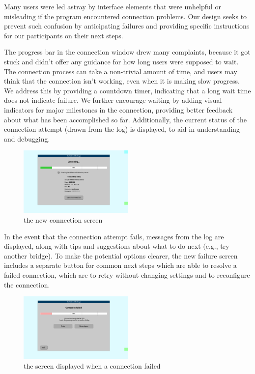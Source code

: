 \documentclass{template}
\begin{document}

Many users were led astray by interface elements that were unhelpful or
misleading if the program encountered connection problems. Our design seeks to
prevent such confusion by anticipating failures and providing specific instructions
for our participants on their next steps.

The progress bar in the connection window drew many complaints, because it got
stuck and didn't offer any guidance for how long users were supposed to wait. 
The connection process can take a non-trivial amount of time, and users may
think that the connection isn't working, even when it is making slow progress. We
address this by providing a countdown timer, indicating that a long wait time does
not indicate failure. We further encourage waiting by adding visual indicators
for major milestones in the connection, providing better feedback about what has
been accomplished so far. Additionally, the current status of the connection
attempt (drawn from the log) is displayed, to aid in understanding and
debugging.

\begin{figure}[h]
  \centering
    \includegraphics[width=0.5\textwidth]{redesign-waiting.png}
    \caption{the new connection screen}
\label{fig:redesign-waiting}
\end{figure}

In the event that the connection attempt fails, messages from the log are
displayed, along with tips and suggestions about what to do next (e.g., try
another bridge). To make the potential options clearer, the new failure screen
includes a separate button for common next steps which are able to resolve
a failed connection, which are to retry without changing settings and to reconfigure 
the connection. \\

\begin{figure}[h]
  \centering
    \includegraphics[width=0.5\textwidth]{redesign-failure.png}
    \caption{the screen displayed when a connection failed}
\label{fig:redesign-failure}
\end{figure}
\end{document}
